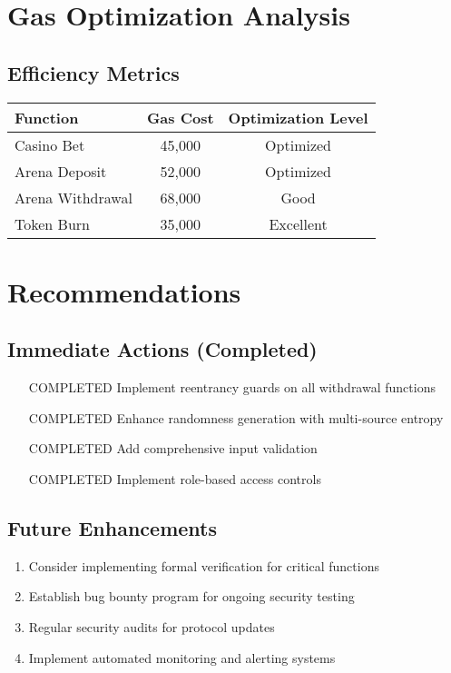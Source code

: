 \documentclass[11pt,a4paper]{article}
\begin{document}
\section{Gas Optimization Analysis}

\subsection{Efficiency Metrics}
\begin{center}
\begin{tabular}{|l|c|c|}
\hline
\textbf{Function} & \textbf{Gas Cost} & \textbf{Optimization Level} \\
\hline
Casino Bet & 45,000 & \textcolor{danzoGreen}{Optimized} \\
Arena Deposit & 52,000 & \textcolor{danzoGreen}{Optimized} \\
Arena Withdrawal & 68,000 & \textcolor{danzoGreen}{Good} \\
Token Burn & 35,000 & \textcolor{danzoGreen}{Excellent} \\
\hline
\end{tabular}
\end{center}

\section{Recommendations}

\subsection{Immediate Actions (Completed)}
\begin{enumerate}
    \item [COMPLETED] Implement reentrancy guards on all withdrawal functions
    \item [COMPLETED] Enhance randomness generation with multi-source entropy
    \item [COMPLETED] Add comprehensive input validation
    \item [COMPLETED] Implement role-based access controls
\end{enumerate}

\subsection{Future Enhancements}
\begin{enumerate}
    \item Consider implementing formal verification for critical functions
    \item Establish bug bounty program for ongoing security testing
    \item Regular security audits for protocol updates
    \item Implement automated monitoring and alerting systems
\end{enumerate}
\end{document}
